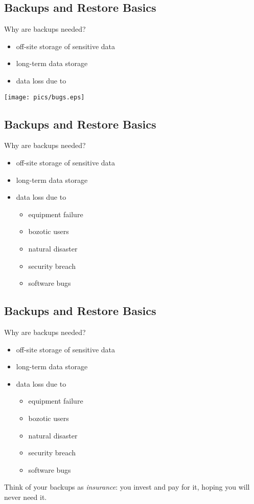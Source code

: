 \documentclass[xga]{xdvislides}
\begin{document}
\subsection{Backups and Restore Basics}
Why are backups needed?
\begin{itemize}
	\item off-site storage of sensitive data
	\item long-term data storage
	\item data loss due to
\end{itemize}
\vspace*{\fill}
\begin{center}
	\texttt{[image: pics/bugs.eps]}
\end{center}
\vspace*{\fill}

\subsection{Backups and Restore Basics}
Why are backups needed?
\begin{itemize}
	\item off-site storage of sensitive data
	\item long-term data storage
	\item data loss due to
		\begin{itemize}
			\item equipment failure
			\item bozotic users
			\item natural disaster
			\item security breach
			\item software bugs
		\end{itemize}
\end{itemize}

\subsection{Backups and Restore Basics}
Why are backups needed?
\begin{itemize}
	\item off-site storage of sensitive data
	\item long-term data storage
	\item data loss due to
		\begin{itemize}
			\item equipment failure
			\item bozotic users
			\item natural disaster
			\item security breach
			\item software bugs
		\end{itemize}
\end{itemize}
\addvspace{.5in}
Think of your backups as {\em insurance}:  you invest and pay for it, hoping
you will never need it.
\end{document}
